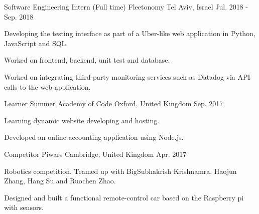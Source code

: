 \begin{cventries}
  \cventry
    {Software Engineering Intern (Full time)} %
    {Fleetonomy} %
    {Tel Aviv, Israel} %
    {Jul. 2018 - Sep. 2018} %
    {
      \begin{cvitems} %
        \item {Developing the testing interface as part of a Uber-like web application in Python, JavaScript and SQL.}
        \item {Worked on frontend, backend, unit test and database.}
        \item {Worked on integrating third-party monitoring services such as Datadog via API calls to the web application.}
      \end{cvitems}
    }
    
    \cventry
    {Learner} %
    {Summer Academy of Code} %
    {Oxford, United Kingdom} %
    {Sep. 2017} %
    {
      \begin{cvitems} %
        \item {Learning dynamic website developing and hosting.}
        \item {Developed an online accounting application using Node.js.}
      \end{cvitems}
    }
    
    \cventry
    {Competitor} %
    {Piwars} %
    {Cambridge, United Kingdom} %
    {Apr. 2017} %
    {
      \begin{cvitems} %
        \item {Robotics competition. Teamed up with BigSubhakrish Krishnamra, Haojun Zhang, Hang Su and Ruochen Zhao.}
        \item {Designed and built a functional remote-control car based on the Raspberry pi with sensors.}
      \end{cvitems}
    }
    
\end{cventries}
